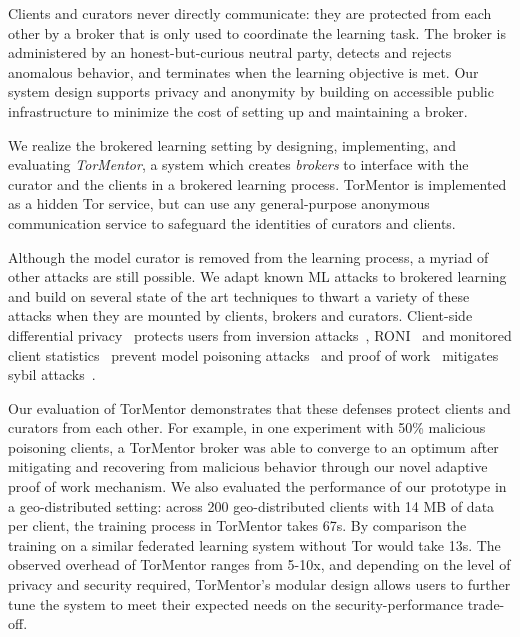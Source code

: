Clients and curators never directly communicate: they are protected
from each other by a broker that is only used to coordinate the
learning task. The broker is administered by an honest-but-curious
neutral party, detects and rejects anomalous behavior, and terminates
when the learning objective is met. Our system design supports privacy
and anonymity by building on accessible public infrastructure to
minimize the cost of setting up and maintaining a broker.

We realize the brokered learning setting by designing, implementing,
and evaluating \emph{TorMentor}, a system which creates \emph{brokers}
to interface with the curator and the clients
in a brokered learning process. TorMentor is
implemented as a hidden Tor service, but can use any general-purpose
anonymous communication service to safeguard the identities of
curators and clients. %


Although the model curator is removed from the learning process, a
myriad of other attacks are still possible. We adapt known ML attacks
to brokered learning and build on several state of the art techniques
to thwart a variety of these attacks when they are mounted by clients,
brokers and curators. Client-side differential
privacy~\cite{Dwork:2014, Geyer:2017} protects users from inversion
attacks~\cite{Fredrikson:2014, Fredrikson:2015}, 
\ac{RONI}~\cite{Barreno:2010} and monitored client
statistics~\cite{Mozaffari-Kermani:2015} prevent model poisoning
attacks~\cite{Biggio:2012, Huang:2011} and proof of
work~\cite{Back:2002} mitigates sybil attacks~\cite{Douceur:2002}.

Our evaluation of TorMentor demonstrates that these defenses protect
clients and curators from each other. For example, in one experiment
with 50\% malicious poisoning clients, a TorMentor broker was able to
converge to an optimum after mitigating and recovering from 
malicious behavior through our novel adaptive proof of work mechanism.
We also evaluated the performance of our prototype in a geo-distributed
setting: across 200 geo-distributed clients with 14 MB of data
per client, the training process in TorMentor takes 67s. By
comparison the training on a similar federated learning system without
Tor would take 13s. The observed overhead of TorMentor ranges from
5-10x, and depending on the level of privacy and security required,
TorMentor's modular design allows users to further tune the system to
meet their expected needs on the security-performance trade-off.

